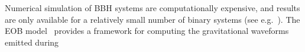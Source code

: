 % 
% 
% 
Numerical simulation of BBH systems are computationally expensive, and results
are only available for a relatively small number of binary systems (see
e.g.~\cite{Ajith:2012tt}).  The EOB model~\cite{EOBOriginalBuonannoDamour}
provides a framework for computing the gravitational waveforms emitted during
